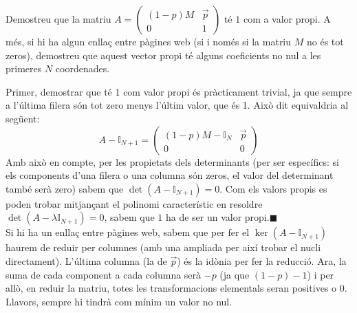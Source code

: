 \documentclass[a4paper, 12pt]{article}
\begin{document}
    \begin{exercici}
        Demostreu que la matriu
        $A
        =
        \left(
            \begin{array}{c|c}
                (1 - p)M & \vec{p} \\
                \hline 0 & 1
            \end{array}
        \right)$
        té $1$ com a valor propi. A més, si hi ha algun enllaç entre pàgines web (si i només si la
        matriu $M$ no és tot zeros), demostreu que aquest vector propi té alguns coeficients no nul a
        les primeres $N$ coordenades.
    \end{exercici}
    \begin{solucio}
        Primer, demostrar que té 1 com valor propi és pràcticament trivial, ja que sempre a l'última
        filera són tot zero menys l'últim valor, que és 1. Això dit equivaldria al següent:
        \begin{displaymath}
            A-\mathbb{I}_{N+1} = 
            \left(
                \begin{array}{c|c}
                    (1 - p)M-\mathbb{I}_{N} & \vec{p} \\
                    \hline 0 & 0
                \end{array}
            \right)
        \end{displaymath}
        Amb això en compte, per les propietats dels determinants (per ser específics: si els
        components d'una filera o una columna són zeros, el valor del determinant també serà zero)
        sabem que $\det(A-\mathbb{I}_{N+1}) = 0$. Com els valors propis es poden trobar mitjançant
        el polinomi característic en resoldre $\det(A-\lambda\mathbb{I}_{N+1}) = 0$, sabem que $1$
        ha de ser un valor propi.\hfill$\blacksquare$\\
        Si hi ha un enllaç entre pàgines web, sabem que per fer el $\ker(A-\mathbb{I}_{N+1})$ haurem
        de reduir per columnes (amb una ampliada per així trobar el nucli directament). L'última
        columna (la de $\vec{p}$) és la idònia per fer la reducció. Ara, la suma de cada component a
        cada columna serà $-p$ (ja que $(1-p)-1$) i per allò, en reduir la matriu, totes les
        transformacions elementals seran positives o $0$. Llavors, sempre hi tindrà com mínim un
        valor no nul.
    \end{solucio}
    
\end{document}
